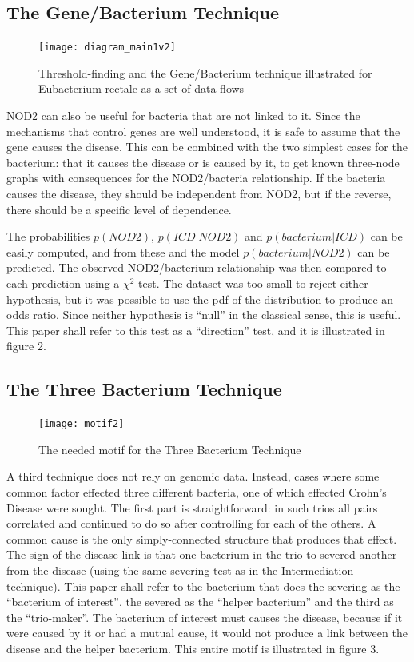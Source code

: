 \documentclass[a4paper]{article}
\begin{document}
\subsection{The Gene/Bacterium Technique}

\begin{figure}[t!]
  \texttt{[image: diagram\_main1v2]}
  \caption{Threshold-finding and the Gene/Bacterium technique
    illustrated for Eubacterium rectale as a set of data flows}
\end{figure}

NOD2 can also be useful for bacteria that are not linked to it.  Since
the mechanisms that control genes are well understood, it is safe to assume
that the gene causes the disease.  This can be combined with the two simplest
cases for the bacterium: that it causes the disease or is
caused by it, to get known three-node graphs with consequences for the
NOD2/bacteria relationship.  If the bacteria causes the disease, they
should be independent from
NOD2, but if the reverse, there should be a specific level of dependence.

The probabilities $p(NOD2)$, $p(ICD|NOD2)$ and
$p(bacterium|ICD)$ can be easily computed, and from these and the
model $p(bacterium|NOD2)$ can be predicted.  
The observed NOD2/bacterium relationship was then compared to each prediction
using a $\chi^2$ test.  The dataset was too small to
reject either hypothesis, but it was possible to use the pdf of the distribution
to produce an odds ratio.  Since neither hypothesis is ``null'' in the
classical sense, this is useful.  This paper shall refer to this test as a
``direction'' test, and it is illustrated in figure 2.

\subsection{The Three Bacterium Technique}

\begin{figure}
  \texttt{[image: motif2]}
  \caption{The needed motif for the Three Bacterium Technique}
\end{figure}

A third technique does not rely on genomic data.  Instead, cases where
some common factor effected three different
bacteria, one of which effected Crohn's Disease were sought.  The first part is
straightforward: in such trios all pairs correlated
and continued to do so after controlling for each of the others.  A
common cause is the only simply-connected structure that produces that
effect.  The sign of the disease link is that  one bacterium in the
trio to severed
another from the disease (using the same severing test as in the
Intermediation technique).  This paper shall refer to the bacterium that does the
severing as the ``bacterium of interest'', the severed as the ``helper
bacterium'' and the third as the ``trio-maker''.  The
bacterium of interest must causes the disease, because if it were caused by
it or had a mutual cause, it would not produce a link between the
disease and the helper bacterium.  This entire motif is illustrated
in figure 3.
\end{document}

